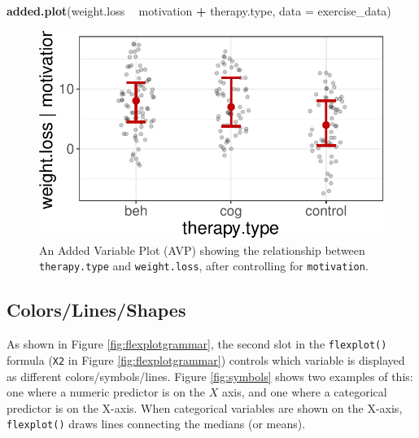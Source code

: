 \documentclass[
  doc]{apa6}
\newenvironment{Shaded}{\begin{snugshade}}{\end{snugshade}}
\newcommand{\DataTypeTok}[1]{\textcolor[rgb]{0.13,0.29,0.53}{#1}}
\newcommand{\KeywordTok}[1]{\textcolor[rgb]{0.13,0.29,0.53}{\textbf{#1}}}
\newcommand{\NormalTok}[1]{#1}
\newcommand{\OperatorTok}[1]{\textcolor[rgb]{0.81,0.36,0.00}{\textbf{#1}}}
\newcommand{\StringTok}[1]{\textcolor[rgb]{0.31,0.60,0.02}{#1}}
\begin{document}
\begin{Shaded}
\begin{Highlighting}[]
\KeywordTok{added.plot}\NormalTok{(weight.loss }\OperatorTok{~}\StringTok{ }\NormalTok{motivation }\OperatorTok{+}\StringTok{ }\NormalTok{therapy.type, }\DataTypeTok{data =}\NormalTok{ exercise_data)}
\end{Highlighting}
\end{Shaded}

\begin{figure}
\centering
\includegraphics{flexplot_psychmeth_files/figure-latex/avp-1.pdf}
\caption{\label{fig:avp}An Added Variable Plot (AVP) showing the relationship between \texttt{therapy.type} and \texttt{weight.loss}, after controlling for \texttt{motivation}. \label{fig:avp}}
\end{figure}

\hypertarget{colorslinesshapes}{%
\subsection{Colors/Lines/Shapes}\label{colorslinesshapes}}

As shown in Figure \ref{fig:flexplotgrammar}, the second slot in the \texttt{flexplot()} formula (\texttt{X2} in Figure \ref{fig:flexplotgrammar}) controls which variable is displayed as different colors/symbols/lines. Figure \ref{fig:symbols} shows two examples of this: one where a numeric predictor is on the \(X\) axis, and one where a categorical predictor is on the X-axis. When categorical variables are shown on the X-axis, \texttt{flexplot()} draws lines connecting the medians (or means).
\end{document}
